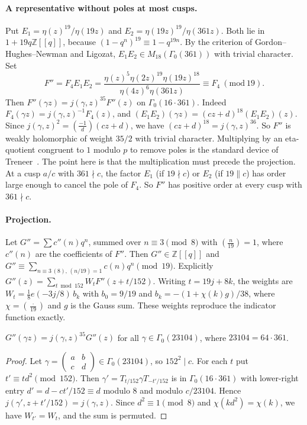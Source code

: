 \documentclass[11pt]{article}
\theoremstyle{remark}\newtheorem{remark}[theorem]{Remark}
\newcommand{\leg}[2]{\left(\frac{#1}{#2}\right)}
\begin{document}
\paragraph{A representative without poles at most cusps.} Put $E_1=\eta(z)^{19}/\eta(19z)$ and $E_2=\eta(19z)^{19}/\eta(361z)$. Both lie in $1+19q\mathbb Z[[q]]$, because $(1-q^n)^{19}\equiv1-q^{19n}$. By the criterion of Gordon--Hughes--Newman and Ligozat, $E_1E_2\in M_{18}(\Gamma_0(361))$ with trivial character. Set
\[F''=F_4E_1E_2=\frac{\eta(z)^{5}\eta(2z)^{19}\eta(19z)^{18}}{\eta(4z)^{6}\eta(361z)}\equiv F_4\ (\mathrm{mod}\ 19).\]
Then $F''(\gamma z)=j(\gamma,z)^{35}F''(z)$ on $\Gamma_0(16\cdot361)$. Indeed $F_4(\gamma z)=j(\gamma,z)^{-1}F_4(z)$, and $(E_1E_2)(\gamma z)=(cz+d)^{18}(E_1E_2)(z)$. Since $j(\gamma,z)^2=\leg{-1}d(cz+d)$, we have $(cz+d)^{18}=j(\gamma,z)^{36}$. So $F''$ is weakly holomorphic of weight $35/2$ with trivial character. Multiplying by an eta-quotient congruent to $1$ modulo $p$ to remove poles is the standard device of Treneer~\cite{Treneer}. The point here is that the multiplication must precede the projection. At a cusp $a/c$ with $361\nmid c$, the factor $E_1$ (if $19\nmid c$) or $E_2$ (if $19\parallel c$) has order large enough to cancel the pole of $F_4$. So $F''$ has positive order at every cusp with $361\nmid c$.

\paragraph{Projection.} Let $G''=\sum c''(n)q^n$, summed over $n\equiv3\pmod8$ with $\leg n{19}=1$, where $c''(n)$ are the coefficients of $F''$. Then $G''\in\mathbb Z[[q]]$ and $G''\equiv\sum_{n\equiv3\,(8),\,(n/19)=1}c(n)q^n\pmod{19}$. Explicitly $G''(z)=\sum_{t\bmod152}W_tF''(z+t/152)$. Writing $t=19j+8k$, the weights are $W_t=\frac18e(-3j/8)\,b_k$ with $b_0=9/19$ and $b_k=-(1+\chi(k)g)/38$, where $\chi=\leg\cdot{19}$ and $g$ is the Gauss sum. These weights reproduce the indicator function exactly.

\begin{lemma}
$G''(\gamma z)=j(\gamma,z)^{35}G''(z)$ for all $\gamma\in\Gamma_0(23104)$, where $23104=64\cdot361$.
\end{lemma}
\begin{proof}
Let $\gamma=\begin{pmatrix}a&b\\c&d\end{pmatrix}\in\Gamma_0(23104)$, so $152^2\mid c$. For each $t$ put $t'\equiv td^2\pmod{152}$. Then $\gamma'=T_{t/152}\gamma T_{-t'/152}$ is in $\Gamma_0(16\cdot361)$ with lower-right entry $d'=d-ct'/152\equiv d$ modulo $8$ and modulo $c/23104$. Hence $j(\gamma',z+t'/152)=j(\gamma,z)$. Since $d^2\equiv1\pmod 8$ and $\chi(kd^2)=\chi(k)$, we have $W_{t'}=W_t$, and the sum is permuted.
\end{proof}
\end{document}
